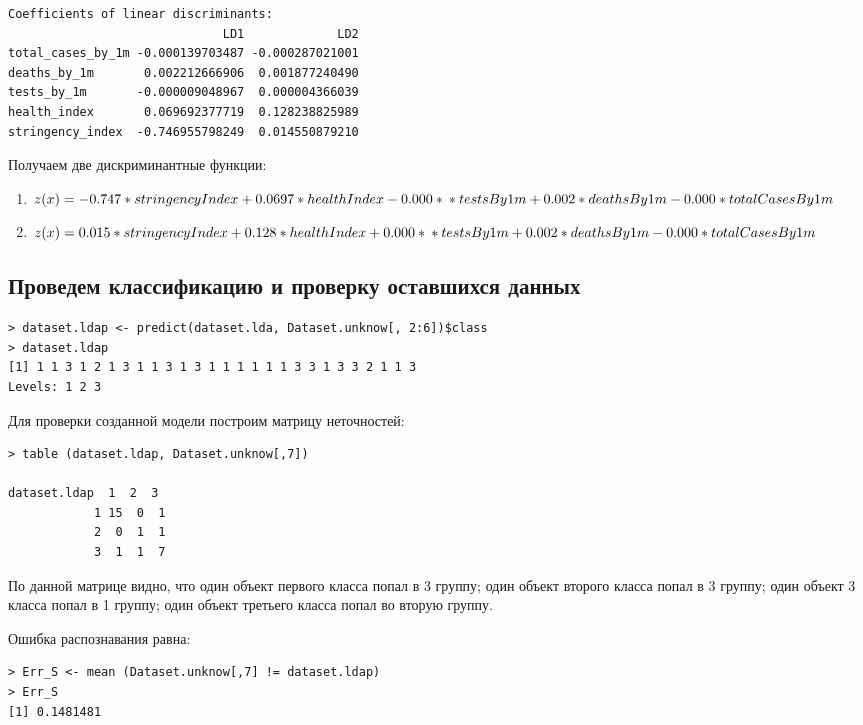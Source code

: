 \documentclass[a4paper,14pt]{extarticle}
\begin{document}
\begin{lstlisting}
Coefficients of linear discriminants:
                              LD1             LD2
total_cases_by_1m -0.000139703487 -0.000287021001
deaths_by_1m       0.002212666906  0.001877240490
tests_by_1m       -0.000009048967  0.000004366039
health_index       0.069692377719  0.128238825989
stringency_index  -0.746955798249  0.014550879210
\end{lstlisting}

Получаем две дискриминантные функции:
\begin{enumerate}
    \item $z(x) = -0.747 * stringencyIndex + 0.0697 * healthIndex - 0.000 * \\ * testsBy1m + 0.002 * deathsBy1m - 0.000 * totalCasesBy1m $
    \item $z(x) = 0.015 * stringencyIndex + 0.128 * healthIndex + 0.000 * \\ * testsBy1m + 0.002 * deathsBy1m - 0.000 * totalCasesBy1m$
\end{enumerate}

\subsection{Проведем классификацию и проверку оставшихся данных}
\begin{lstlisting}
> dataset.ldap <- predict(dataset.lda, Dataset.unknow[, 2:6])$class
> dataset.ldap
[1] 1 1 3 1 2 1 3 1 1 3 1 3 1 1 1 1 1 1 3 3 1 3 3 2 1 1 3
Levels: 1 2 3
\end{lstlisting}

Для проверки созданной модели построим матрицу неточностей:

\begin{lstlisting}
> table (dataset.ldap, Dataset.unknow[,7]) 
        
dataset.ldap  1  2  3
            1 15  0  1
            2  0  1  1
            3  1  1  7
\end{lstlisting}

По данной матрице видно, что один объект первого класса попал в 3 группу; один
объект второго класса попал в 3 группу; один объект 3 класса попал в 1 группу;
один объект третьего класса попал во вторую группу.

Ошибка распознавания равна:
\begin{lstlisting}
> Err_S <- mean (Dataset.unknow[,7] != dataset.ldap)
> Err_S
[1] 0.1481481
\end{lstlisting}
\end{document}
